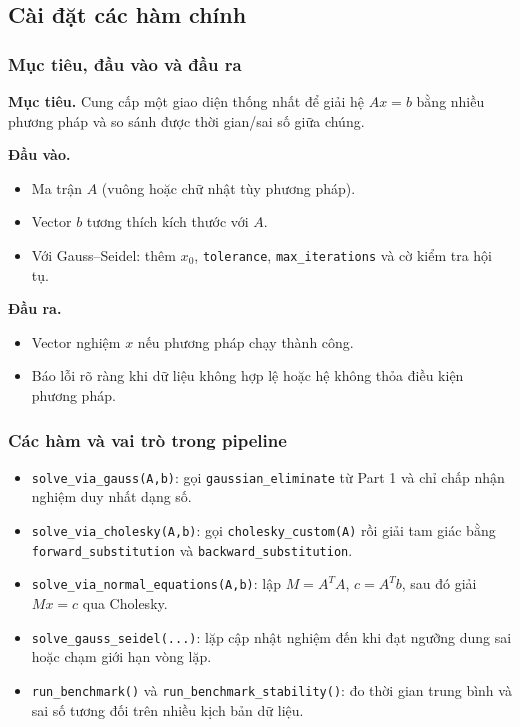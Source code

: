 \documentclass[a4paper]{article}
\begin{document}
\subsection{Cài đặt các hàm chính}

\subsubsection{Mục tiêu, đầu vào và đầu ra}

\textbf{Mục tiêu.} Cung cấp một giao diện thống nhất để giải hệ $Ax=b$ bằng nhiều phương pháp và so sánh được thời gian/sai số giữa chúng.

\textbf{Đầu vào.}
\begin{itemize}
    \item Ma trận $A$ (vuông hoặc chữ nhật tùy phương pháp).
    \item Vector $b$ tương thích kích thước với $A$.
    \item Với Gauss--Seidel: thêm $x_0$, \texttt{tolerance}, \texttt{max\_iterations} và cờ kiểm tra hội tụ.
\end{itemize}

\textbf{Đầu ra.}
\begin{itemize}
    \item Vector nghiệm $x$ nếu phương pháp chạy thành công.
    \item Báo lỗi rõ ràng khi dữ liệu không hợp lệ hoặc hệ không thỏa điều kiện phương pháp.
\end{itemize}

\subsubsection{Các hàm và vai trò trong pipeline}

\begin{itemize}
    \item \texttt{solve\_via\_gauss(A,b)}: gọi \texttt{gaussian\_eliminate} từ Part 1 và chỉ chấp nhận nghiệm duy nhất dạng số.
    \item \texttt{solve\_via\_cholesky(A,b)}: gọi \texttt{cholesky\_custom(A)} rồi giải tam giác bằng \texttt{forward\_substitution} và \texttt{backward\_substitution}.
    \item \texttt{solve\_via\_normal\_equations(A,b)}: lập $M=A^TA$, $c=A^Tb$, sau đó giải $Mx=c$ qua Cholesky.
    \item \texttt{solve\_gauss\_seidel(...)}: lặp cập nhật nghiệm đến khi đạt ngưỡng dung sai hoặc chạm giới hạn vòng lặp.
    \item \texttt{run\_benchmark()} và \texttt{run\_benchmark\_stability()}: đo thời gian trung bình và sai số tương đối trên nhiều kịch bản dữ liệu.
\end{itemize}
\end{document}
